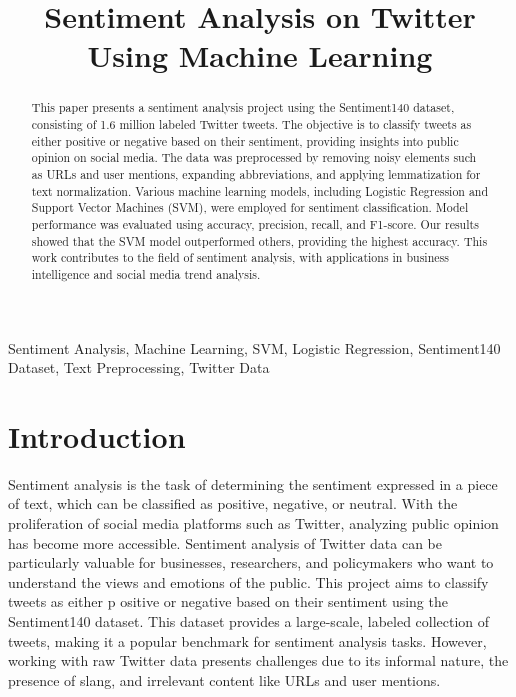 \documentclass[conference]{IEEEtran}
\begin{document}
\title{Sentiment Analysis on Twitter Using Machine Learning\\
}

\author{
}

\maketitle

\begin{abstract}
This paper presents a sentiment analysis project using the Sentiment140 dataset, consisting of 1.6 million labeled Twitter tweets. 
The objective is to classify tweets as either positive or negative based on their sentiment, providing insights into public opinion on social media.
 The data was preprocessed by removing noisy elements such as URLs and user mentions, expanding abbreviations, and applying lemmatization for text normalization. 
 Various machine learning models, including Logistic Regression and Support Vector Machines (SVM), were employed for sentiment classification. Model performance 
 was evaluated using accuracy, precision, recall, and F1-score. Our results showed that the SVM model outperformed others, providing the highest accuracy. This work 
 contributes to the field of sentiment analysis, with applications in business intelligence and social media trend analysis.
\end{abstract}


\begin{IEEEkeywords}
Sentiment Analysis, Machine Learning, SVM, Logistic Regression, Sentiment140 Dataset, Text Preprocessing, Twitter Data
\end{IEEEkeywords}

\section{Introduction}
Sentiment analysis is the task of determining the sentiment expressed in a piece of text, 
which can be classified as positive, negative, or neutral. With the proliferation of social media platforms such as Twitter, 
analyzing public opinion has become more accessible. Sentiment analysis of Twitter data can be particularly valuable for businesses, 
researchers, and policymakers who want to understand the views and emotions of the public. This project aims to classify tweets as either p
ositive or negative based on their sentiment using the Sentiment140 dataset. This dataset provides a large-scale, labeled collection of tweets, 
making it a popular benchmark for sentiment analysis tasks. However, working with raw Twitter data presents challenges due to its informal nature, 
the presence of slang, and irrelevant content like URLs and user mentions.
\end{document}
